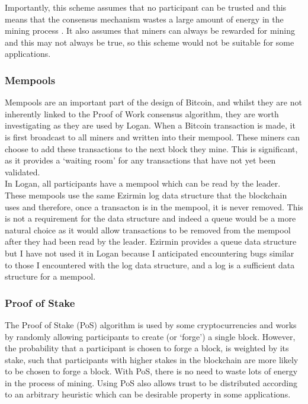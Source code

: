 \documentclass[12pt,a4paper,twoside,openright]{report}
\begin{document}
	Importantly, this scheme assumes that no participant can be trusted 
	and this means that the consensus mechanism wastes a large amount of energy in the mining process \parencite{BitcoinEnergy}.
	It also assumes that miners can always be rewarded for mining and this may not always be true, so this scheme would not be suitable for some applications.
	
	\subsubsection*{Mempools}
	Mempools are an important part of the design of Bitcoin, and whilst they are not inherently linked to the Proof of Work consensus algorithm, they are worth investigating as they are used by Logan.
	When a Bitcoin transaction is made, it is first broadcast to all miners and written into their mempool. 
	These miners can choose to add these transactions to the next block they mine.
	This is significant, as it provides a `waiting room' for any transactions that have not yet been validated.\\

	In Logan, all participants have a mempool which can be read by the leader. 
	These mempools use the same Ezirmin log data structure that the blockchain uses and therefore, once a transacton is in the mempool, it is never removed. 
	This is not a requirement for the data structure and indeed a queue would be a more natural choice as it would allow transactions to be removed from the mempool after they had been read by the leader.
	Ezirmin provides a queue data structure but I have not used it in Logan because I anticipated encountering bugs similar to those I encountered with the log data structure, and a log is a sufficient data structure for a mempool.

	\subsubsection*{Proof of Stake}
	The Proof of Stake (PoS) algorithm \parencite{ProofofStake} is used by some cryptocurrencies and works by randomly allowing participants to create (or `forge') a single block.
	However, the probability that a participant is chosen to forge a block, is weighted by its stake, such that participants with higher stakes in the blockchain are more likely to be chosen to forge a block.
	With PoS, there is no need to waste lots of energy in the process of mining. 
	Using PoS also allows trust to be distributed according to an arbitrary heuristic which can be desirable property in some applications.\\
\end{document}
